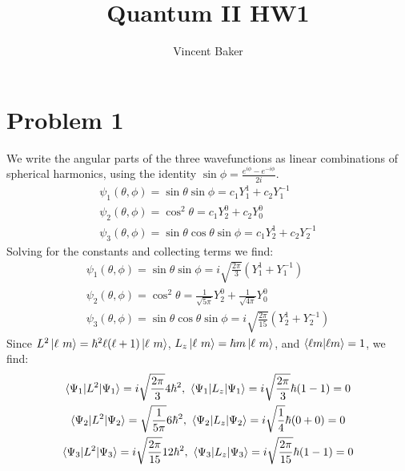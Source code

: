 \documentclass[a4paper,12pt]{article}
\title{Quantum II HW1}
\author{Vincent Baker}
\numberwithin{equation}{section}
\begin{document}
\maketitle

\section{Problem 1}
We write the angular parts of the three wavefunctions as linear combinations of spherical harmonics, using the identity $\sin{\phi}=\frac{e^{i\phi}-e^{-i\phi}}{2i}$.
\begin{gather}
 \psi_1(\theta,\phi)=\sin{\theta}\sin{\phi}=c_1Y_1^1 + c_2Y_1^{-1}\\
 \psi_2(\theta,\phi)=\cos^2{\theta}=c_1Y_2^0 + c_2Y_0^0\\
 \psi_3(\theta,\phi)=\sin{\theta}\cos{\theta}\sin{\phi}=c_1Y_2^1 + c_2Y_2^{-1}
\end{gather}
Solving for the constants and collecting terms we find:
\begin{gather}
 \psi_1(\theta,\phi)=\sin{\theta}\sin{\phi}=i\sqrt{\frac{2\pi}{3}}\left (Y_1^1 + Y_1^{-1}\right)\\
 \psi_2(\theta,\phi)=\cos^2{\theta}=\frac{1}{\sqrt{5\pi}}Y_2^0+\frac{1}{\sqrt{4\pi}}Y_0^0\\
 \psi_3(\theta,\phi)=\sin{\theta}\cos{\theta}\sin{\phi}=i\sqrt{\frac{2\pi}{15}} \left (Y_2^1 + Y_2^{-1}\right)
\end{gather}
Since $L^2\ket{\ell\ m}=\hbar^2\ell(\ell+1)\ket{\ell\ m}$, $L_z\ket{\ell\ m}= \hbar m\ket{\ell\ m}$,
and $\braket{\ell m|\ell m }=1$, we find:
\begin{gather}
 \braket{\Psi_1|L^2|\Psi_1} = i\sqrt{\frac{2\pi}{3}}4\hbar^2,\ \braket{\Psi_1|L_z|\Psi_1}=i\sqrt{\frac{2\pi}{3}}\hbar(1-1)=0\\
 \braket{\Psi_2|L^2|\Psi_2} = \sqrt{\frac{1}{5\pi}}6\hbar^2,\ \braket{\Psi_2|L_z|\Psi_2}=i\sqrt{\frac{1}{4}}\hbar(0+0)=0\\
 \braket{\Psi_3|L^2|\Psi_3} = i\sqrt{\frac{2\pi}{15}}12\hbar^2,\ \braket{\Psi_3|L_z|\Psi_3}=i\sqrt{\frac{2\pi}{15}}\hbar(1-1)=0
\end{gather}
\end{document}

